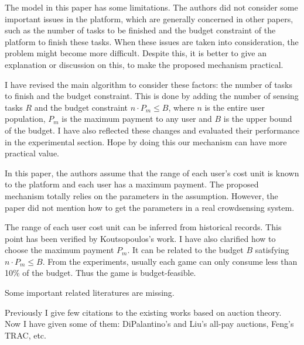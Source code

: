 \documentclass[a4paper,11pt]{exam}
\begin{document}
\begin{questions}
\question The model in this paper has some limitations. The authors did not consider some important issues in the platform, which are generally concerned in other papers, such as the number of tasks to be finished and the budget constraint of the platform to finish these tasks. When these issues are taken into consideration, the problem might become more difficult. Despite this, it is better to give an explanation or discussion on this, to make the proposed mechanism practical. 
\begin{solution}
I have revised the main algorithm to consider these factors: the number of tasks to finish and the budget constraint. This is done by adding the number of sensing tasks $R$ and the budget constraint $n\cdot P_m \leq B$, where $n$ is the entire user population, $P_m$ is the maximum payment to any user and $B$ is the upper bound of the budget. I have also reflected these changes and evaluated their performance in the experimental section. Hope by doing this our mechanism can have more practical value.
\end{solution}

\question In this paper, the authors assume that the range of each user’s cost unit is known to the platform and each user has a maximum payment. The proposed mechanism totally relies on the parameters in the assumption. However, the paper did not mention how to get the parameters in a real crowdsensing system.
\begin{solution}
The range of each user cost unit can be inferred from historical records. This point has been verified by Koutsopoulos's work. I have also clarified how to choose the maximum payment $P_m$. It can be related to the budget $B$ satisfying $n\cdot P_m \leq B$. From the experiments, usually each game can only consume less than 10\% of the budget. Thus the game is budget-feasible. 
\end{solution}

\question Some important related literatures are missing.
\begin{solution}
Previously I give few citations to the existing works based on auction theory. Now I have given some of them: DiPalantino's and Liu's all-pay auctions, Feng's TRAC, etc.
\end{solution}


\end{questions}
\end{document}

